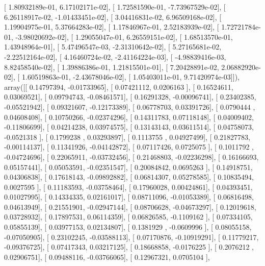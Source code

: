 \documentclass{article}
\begin{document}
       [  1.80932189e-01,   6.17102171e-02],
       [  1.72581590e-01,  -7.73967529e-02],
       [  6.26118917e-02,  -1.01433451e-02],
       [  3.04416831e-02,   6.96509168e-02],
       [  1.19904975e-01,   5.37664283e-02],
       [  1.17846967e-01,   2.52183939e-02],
       [  1.72721784e-01,  -3.98020692e-02],
       [  1.29055047e-01,   6.26559151e-02],
       [  1.68513570e-01,   1.43948964e-01],
       [  5.47496547e-03,  -2.31310642e-02],
       [  5.27165681e-02,  -2.22512164e-02],
       [  4.16460724e-02,  -2.41164224e-03],
       [ -4.98839416e-03,   8.82458540e-02],
       [  1.39886386e-01,   1.21815501e-01],
       [  7.20428891e-02,   2.06882920e-02],
       [  1.60519863e-01,  -2.43678046e-02],
       [  1.05403011e-01,   9.71420974e-03]]), array([[ 0.14797394, -0.01733965],
       [ 0.07421112,  0.0206163 ],
       [ 0.16524611,  0.03069521],
       [ 0.09794743, -0.08461571],
       [ 0.16291328, -0.00096741],
       [ 0.23402385, -0.05521942],
       [ 0.09321607, -0.12173389],
       [ 0.06778703,  0.03391726],
       [ 0.0790444 ,  0.04608408],
       [ 0.10750266, -0.02374296],
       [ 0.14311783,  0.07118148],
       [ 0.04009402, -0.11806699],
       [ 0.04214238,  0.03974575],
       [ 0.13143143,  0.03611514],
       [ 0.04758073, -0.0521318 ],
       [ 0.1799238 ,  0.03293897],
       [ 0.1113755 ,  0.04927499],
       [ 0.21827783, -0.00114137],
       [ 0.11341926, -0.04142872],
       [ 0.07117426,  0.0725075 ],
       [ 0.1011792 , -0.04724696],
       [ 0.22065911, -0.03732456],
       [ 0.21468803, -0.02236298],
       [ 0.16166693,  0.05157441],
       [ 0.05053591, -0.02351547],
       [ 0.20084842,  0.0695263 ],
       [ 0.14918751,  0.04306838],
       [ 0.17618143, -0.09892882],
       [ 0.06814307,  0.05278585],
       [ 0.10835494,  0.0027595 ],
       [ 0.11183593, -0.03758464],
       [ 0.17960028,  0.00424861],
       [ 0.04393451,  0.01027995],
       [ 0.14334335,  0.02161017],
       [ 0.08711096, -0.01053389],
       [ 0.06816498,  0.04613949],
       [ 0.21551901, -0.02947144],
       [ 0.08706628, -0.04673297],
       [ 0.12019618,  0.03728932],
       [ 0.17897531,  0.06114359],
       [ 0.06826585, -0.1109162 ],
       [ 0.07334105,  0.05855139],
       [ 0.03977153,  0.02134807],
       [ 0.1381929 , -0.0609996 ],
       [ 0.08055158, -0.07050905],
       [ 0.23102245, -0.03588113],
       [ 0.07170876, -0.10919291],
       [ 0.11779217, -0.09376725],
       [ 0.07417343,  0.03217125],
       [ 0.18668858, -0.0176225 ],
       [ 0.2076212 ,  0.02906751],
       [ 0.09488116, -0.03766065],
       [ 0.12967321,  0.0705104 ],
\end{document}

